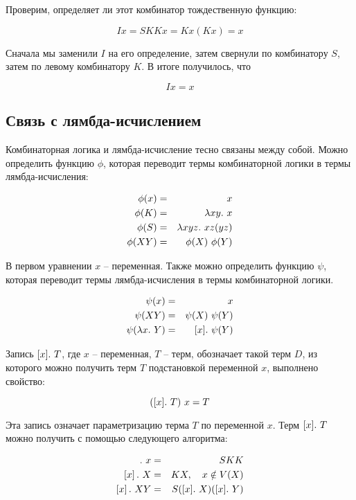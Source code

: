 Проверим, определяет ли этот комбинатор тождественную функцию:

\[ Ix = SKKx = Kx(Kx) = x \]

Сначала мы заменили $I$ на его определение, затем свернули
по комбинатору $S$, затем по левому комбинатору $K$. В итоге
получилось, что

\[ Ix = x \]

\subsection{Связь с лямбда-исчислением}

Комбинаторная логика
и лямбда-исчисление тесно связаны между собой. Можно определить
функцию $\phi$, которая переводит термы комбинаторной логики в 
термы лямбда-исчисления:

\begin{eqnarray*}
\phi(x) &=& x \\
\phi(K) &=& \lambda xy .\  x \\
\phi(S) &=& \lambda xyz .\  xz(yz) \\
\phi(XY) &=& \phi(X)\ \phi(Y) \\
\end{eqnarray*}

В первом уравнении $x$ -- переменная. Также можно
определить функцию $\psi$, которая переводит термы
лямбда-исчисления в термы комбинаторной логики.

\begin{eqnarray*}
\psi(x) &=& x \\
\psi(XY) &=& \psi(X)\ \psi(Y) \\
\psi(\lambda x .\  Y) &=& [x] .\  \psi(Y) \\
\end{eqnarray*}

Запись $[x].\  T$, где $x$ -- переменная, $T$ -- терм, обозначает
такой терм $D$, из которого можно получить терм $T$ подстановкой
переменной $x$, выполнено свойство:

\[ ([x].\  T)\ x = T  \]

Эта запись означает параметризацию терма $T$ по переменной $x$.
Терм  $[x].\  T$ можно получить с помощью следующего алгоритма:

\begin{eqnarray*}
[x] \D x &=& SKK \\ 
\left[x\right] \D X &=& KX, \quad x \notin V(X) \\
\left[x\right] \D XY &=& S([x] \D X)([x]\D Y) \\
\end{eqnarray*}

